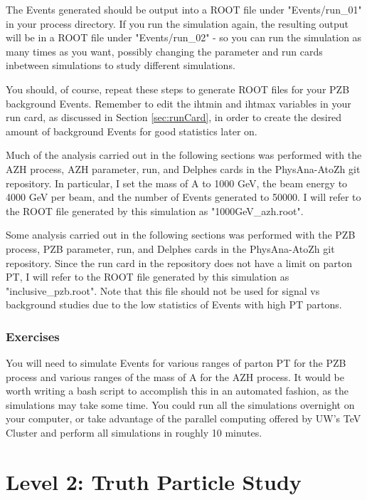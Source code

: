 \documentclass{article}
\begin{document}
\bigskip

The Events generated should be output into a ROOT file under "Events/run\_01" in your
process directory. If you run the simulation again, the resulting output will be in a
ROOT file under "Events/run\_02" - so you can run the simulation as many times as you
want, possibly changing the parameter and run cards inbetween simulations to study different simulations.

\bigskip

You should, of course, repeat these steps to generate ROOT files for your PZB background Events. Remember
to edit the ihtmin and ihtmax variables in your run card, as discussed in Section \ref{sec:runCard}, in order to create the desired
amount of background Events for good statistics later on.

\bigskip

Much of the analysis carried out in the following sections was performed with the AZH process, AZH parameter, run, and Delphes cards
in the PhysAna-AtoZh git repository. In particular, I set the mass of A to 1000 GeV, the beam energy to 4000 GeV per beam, 
and the number of Events generated to 50000. I will refer to the ROOT file generated by this simulation as "1000GeV\_azh.root".

\bigskip

Some analysis carried out in the following sections was performed with the PZB process, PZB parameter, run, and Delphes cards
in the PhysAna-AtoZh git repository. Since the run card in the repository does not have a limit on parton PT, I will refer to the
ROOT file generated by this simulation as "inclusive\_pzb.root". Note that this file should not be used for signal vs background
studies due to the low statistics of Events with high PT partons.

\subsubsection*{Exercises}

You will need to simulate Events for various ranges of parton PT for the PZB process and various ranges of the mass of A for the AZH process.
It would be worth writing a bash script to accomplish this in an automated fashion, as the simulations may take some time.
You could run all the simulations overnight on your computer, or take advantage of the parallel computing offered by UW's TeV Cluster
and perform all simulations in roughly 10 minutes.

\section{Level 2: Truth Particle Study}
\label{sec:level2}
\end{document}

